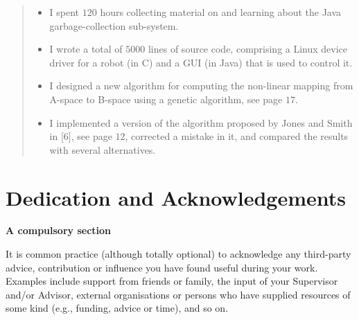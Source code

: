 \documentclass[ oneside,%
                    author={Michael Wray},
                    degree={BSc},
                     title={Some Structural Guidelines for CS Project Dissertations \\ With a Second Line Added to the Title},
                    unit={COMS30045},
                    subtitle={And Even A Fancy Subtitle}]{dissertation}
\begin{document}
\begin{quote}
\noindent
\begin{itemize}
\item I spent $120$ hours collecting material on and learning about the 
      Java garbage-collection sub-system. 
\item I wrote a total of $5000$ lines of source code, comprising a Linux 
      device driver for a robot (in C) and a GUI (in Java) that is 
      used to control it.
\item I designed a new algorithm for computing the non-linear mapping 
      from A-space to B-space using a genetic algorithm, see page $17$.
\item I implemented a version of the algorithm proposed by Jones and 
      Smith in [6], see page $12$, corrected a mistake in it, and 
      compared the results with several alternatives.
\end{itemize}
\end{quote}



\chapter*{Dedication and Acknowledgements}

{\bf A compulsory section}
\vspace{1cm} 

\noindent
It is common practice (although totally optional) to acknowledge any
third-party advice, contribution or influence you have found useful
during your work.  Examples include support from friends or family, 
the input of your Supervisor and/or Advisor, external organisations 
or persons who  have supplied resources of some kind (e.g., funding, 
advice or time), and so on.




\makedecl



\end{document}
